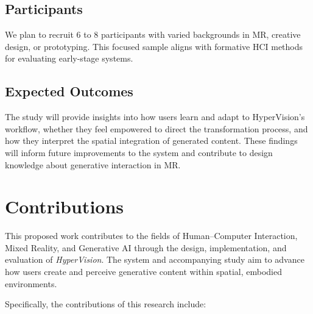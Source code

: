 \subsection{Participants}

We plan to recruit 6 to 8 participants with varied backgrounds in MR, creative design, or prototyping. This focused sample aligns with formative HCI methods for evaluating early-stage systems.

\subsection{Expected Outcomes}

The study will provide insights into how users learn and adapt to HyperVision’s workflow, whether they feel empowered to direct the transformation process, and how they interpret the spatial integration of generated content. These findings will inform future improvements to the system and contribute to design knowledge about generative interaction in MR.



\section{Contributions}

This proposed work contributes to the fields of Human–Computer Interaction, Mixed Reality, and Generative AI through the design, implementation, and evaluation of \textit{HyperVision}. The system and accompanying study aim to advance how users create and perceive generative content within spatial, embodied environments.

Specifically, the contributions of this research include:

